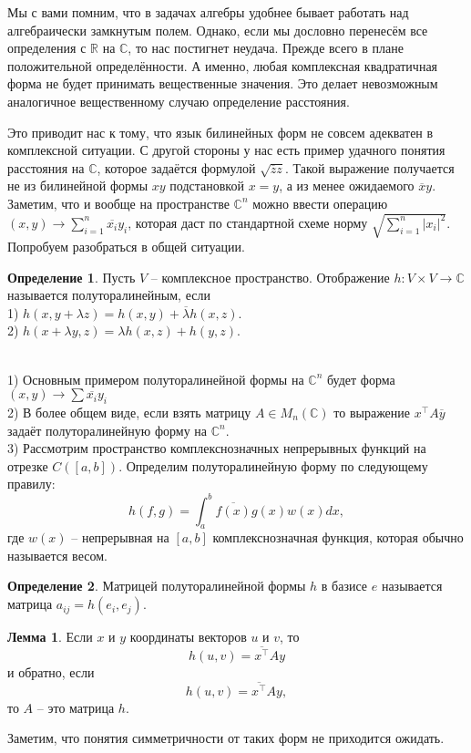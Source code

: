 \documentclass[10pt,a4paper,oneside]{book}
\theoremstyle{definition}
\newtheorem*{defn}{Определение}
\newtheorem{lem}{Лемма}
\newcommand{\mb}[1]{\mathbb{#1}}
\newcommand{\ovl}{\overline}
\def\exm{\noindent {\bf Примеры:}}
\def\dfn{\begin{defn}}
\def\edfn{\end{defn}}
\def\lm{\begin{lem}}
\def\elm{\end{lem}}
\begin{document}
Мы с вами помним, что в задачах алгебры  удобнее бывает работать над алгебраически замкнутым полем. Однако, если мы дословно перенесём все определения с $\mb R$ на $\mb C$, то нас постигнет неудача. Прежде всего в плане положительной определённости. А именно, любая комплексная квадратичная форма не будет принимать вещественные значения. Это делает невозможным аналогичное вещественному случаю определение расстояния. 

Это приводит нас к тому, что язык билинейных форм не совсем адекватен в комплексной ситуации. С другой стороны у нас есть пример удачного понятия расстояния на $\mb C$, которое задаётся формулой $\sqrt{\ovl{z}z}$. Такой выражение получается не из билинейной формы $xy$ подстановкой $x=y$, а из менее ожидаемого $\ovl{x}y$. Заметим, что и вообще на пространстве $\mb C^n$ можно ввести операцию $
(x,y) \to \sum_{i=1}^n \ovl{x_i}y_i$, которая даст по стандартной схеме норму $\sqrt{\sum_{i=1}^n |x_i|^2}$. Попробуем разобраться в общей ситуации.

\dfn Пусть $V$ -- комплексное пространство.  Отображение $h\colon V \times V \to \mb C$ называется полуторалинейным, если \\
1) $h(x,y+\lambda z)=h(x,y)+\ovl{\lambda} h(x,z)$. \\
2) $h(x+\lambda y,z)=\lambda h(x,z)+h(y,z)$.
\edfn

\exm\\
1) Основным примером полуторалинейной формы на $\mb C^n$ будет форма $(x,y)\to \sum \ovl{x_i}y_i$\\
2) В более общем виде, если взять матрицу $A\in M_n(\mb C)$  то выражение $x^{\top}A\ovl{y}$ задаёт полуторалинейную форму на $\mb C^n$.\\
3) Рассмотрим пространство комплекснозначных непрерывных функций на отрезке $C([a,b])$. Определим полуторалинейную форму по следующему правилу:
$$h(f,g)=\int_a^b \ovl{f(x)}g(x)w(x)dx,$$
где $w(x)$ -- непрерывная на $[a,b]$ комплекснозначная функция, которая обычно называется весом.\\



\dfn Матрицей полуторалинейной формы $h$
в базисе $e$ называется матрица $a_{ij}=h(e_i,e_j)$. 
\edfn

\lm Если $x$ и $y$ координаты векторов $u$ и $v$, то $$h(u,v)=\ovl{x^{\top}}Ay$$
и обратно, если $$h(u,v)=\ovl{x^{\top}}Ay,$$
то $A$ -- это матрица $h$.
\elm



Заметим, что понятия симметричности  от таких форм не приходится ожидать.
\end{document}

